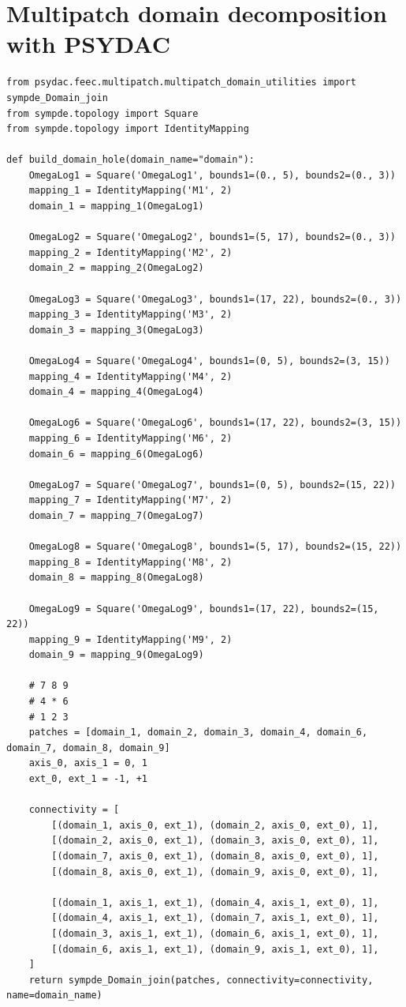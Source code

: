 \documentclass[a4paper,12pt,twoside]{report}
\begin{document}
\section{Multipatch domain decomposition with PSYDAC}
\label{sec:multipatch_code}
\vspace{-0.5cm}
\begin{lstlisting}[caption=Multipatch domain decomposition with PSYDAC.]
from psydac.feec.multipatch.multipatch_domain_utilities import sympde_Domain_join
from sympde.topology import Square
from sympde.topology import IdentityMapping

def build_domain_hole(domain_name="domain"):
    OmegaLog1 = Square('OmegaLog1', bounds1=(0., 5), bounds2=(0., 3))
    mapping_1 = IdentityMapping('M1', 2)
    domain_1 = mapping_1(OmegaLog1)

    OmegaLog2 = Square('OmegaLog2', bounds1=(5, 17), bounds2=(0., 3))
    mapping_2 = IdentityMapping('M2', 2)
    domain_2 = mapping_2(OmegaLog2)

    OmegaLog3 = Square('OmegaLog3', bounds1=(17, 22), bounds2=(0., 3))
    mapping_3 = IdentityMapping('M3', 2)
    domain_3 = mapping_3(OmegaLog3)

    OmegaLog4 = Square('OmegaLog4', bounds1=(0, 5), bounds2=(3, 15))
    mapping_4 = IdentityMapping('M4', 2)
    domain_4 = mapping_4(OmegaLog4)

    OmegaLog6 = Square('OmegaLog6', bounds1=(17, 22), bounds2=(3, 15))
    mapping_6 = IdentityMapping('M6', 2)
    domain_6 = mapping_6(OmegaLog6)

    OmegaLog7 = Square('OmegaLog7', bounds1=(0, 5), bounds2=(15, 22))
    mapping_7 = IdentityMapping('M7', 2)
    domain_7 = mapping_7(OmegaLog7)

    OmegaLog8 = Square('OmegaLog8', bounds1=(5, 17), bounds2=(15, 22))
    mapping_8 = IdentityMapping('M8', 2)
    domain_8 = mapping_8(OmegaLog8)

    OmegaLog9 = Square('OmegaLog9', bounds1=(17, 22), bounds2=(15, 22))
    mapping_9 = IdentityMapping('M9', 2)
    domain_9 = mapping_9(OmegaLog9)
    
    # 7 8 9
    # 4 * 6
    # 1 2 3
    patches = [domain_1, domain_2, domain_3, domain_4, domain_6, domain_7, domain_8, domain_9]
    axis_0, axis_1 = 0, 1
    ext_0, ext_1 = -1, +1

    connectivity = [
        [(domain_1, axis_0, ext_1), (domain_2, axis_0, ext_0), 1],
        [(domain_2, axis_0, ext_1), (domain_3, axis_0, ext_0), 1],
        [(domain_7, axis_0, ext_1), (domain_8, axis_0, ext_0), 1],
        [(domain_8, axis_0, ext_1), (domain_9, axis_0, ext_0), 1],

        [(domain_1, axis_1, ext_1), (domain_4, axis_1, ext_0), 1],
        [(domain_4, axis_1, ext_1), (domain_7, axis_1, ext_0), 1],
        [(domain_3, axis_1, ext_1), (domain_6, axis_1, ext_0), 1],
        [(domain_6, axis_1, ext_1), (domain_9, axis_1, ext_0), 1],
    ]
    return sympde_Domain_join(patches, connectivity=connectivity, name=domain_name)
\end{lstlisting}
\end{document}

